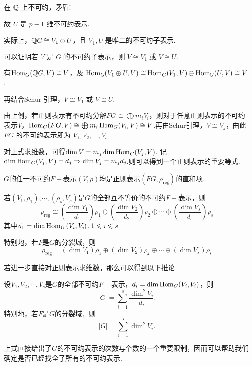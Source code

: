 \begin{instance}
\begin{enumerate}[label=(\arabic*)]
\begin{equation*}
    \end{equation*} 在 $\mathbb{Q}$ 上不可约，矛盾!\par
        故 $U$ 是 $p-1$ 维不可约表示.
    \end{enumerate}\par
    实际上，$\mathbb{Q}G \cong V_1 \oplus U$，且 $V_1, U$ 是唯二的不可约子表示.\par
    可以证明若 $V$ 是 $G$ 的不可约子表示，则 $V \cong V_1$ 或 $V \cong U$.\par
    有$\operatorname{Hom}_G(\mathbb{Q}G, V) \cong V$，及 $\operatorname{Hom}_G(V_1 \oplus U, V) \cong \operatorname{Hom}_G(V_1, V) \oplus \operatorname{Hom}_G(U, V) \cong V$.\par
    再结合Schur 引理，$V \cong V_1$ 或 $V \cong U$.
\end{instance}

由上例，若正则表示有不可约分解$FG \cong \bigoplus m_i V_i$，则对于任意正则表示的不可约表示$V$，$\operatorname{Hom}_G(FG, V) \cong \bigoplus m_i \operatorname{Hom}_G(V_i, V) \cong V$.再由Schur引理，$V\cong V_j$，由此$FG$ 的不可约表示即为 $V_1, V_2, \dots, V_s$.\par
对上式求维数，可得$\dim V = m_j \dim \operatorname{Hom}_G(V_j, V)$. 记 $\dim \operatorname{Hom}_G(V_j, V) = d_j \Rightarrow \dim V_j = m_j d_j$.则可以得到一个正则表示的重要等式.
\begin{theorem}[正则表示的不可约分解]
    $G$的任一不可约$F-\!$表示$(V,\rho)$均是正则表示$\left(FG,\rho_\mathrm{reg}\right)$的直和项.\par
    若$(V_1,\rho_1),\cdots,\left(\rho_s,V_s\right)$是$G$的全部互不等价的不可约$F-\!$表示，则
    \[\rho_{\mathrm{reg}} \cong \left(\frac{\dim V_1}{d_1}\right)\rho_1 \oplus \left(\frac{\dim V_2}{d_2}\right)\rho_2 \oplus \cdots \oplus \left(\frac{\dim V_s}{d_s}\right)\rho_s\]
    其中$d_1=\dim\operatorname{Hom}_G\left(V_i,V_i\right),1\leqslant i\leqslant s$.\par
    特别地，若$F$是$G$的分裂域，则\begin{equation*}
    \rho_\mathrm{reg}=\left(\dim V_1\right)\rho_1\oplus \left(\dim V_2\right)\rho_2\oplus \cdots \oplus \left(\dim V_s\right)\rho_s
\end{equation*}
\end{theorem}
若进一步直接对正则表示求维数，那么可以得到以下推论
\begin{corollary}[]
    设$V_1,V_2,\cdots,V_s$是$G$的全部不可约$F-\!$表示，$d_i=\dim\operatorname{Hom}_G(V_i,V_i)$，则\begin{equation*}
    |G|=\sum_{i=1}^s \frac{\dim^2{V_i}}{d_i}.
    \end{equation*}
    特别地，若$F$是$G$的分裂域，则\begin{equation*}
    |G|=\sum_{i=1}^s \dim^2{V_i}.
\end{equation*}
\end{corollary}
上式直接给出了$G$的不可约表示的次数与个数的一个重要限制，因而可以帮助我们确定是否已经找全了所有的不可约表示.

